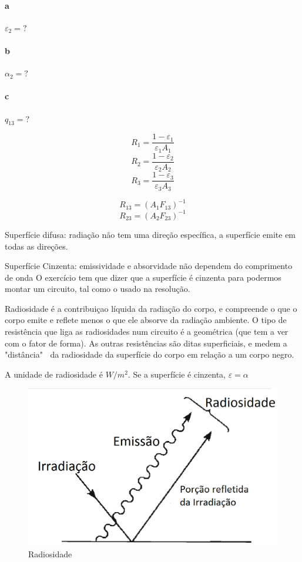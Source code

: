 \documentclass[a4paper, 12pt]{article}
\begin{document}
\paragraph*{a} $\varepsilon _{2} = ? $
\paragraph*{b} $\alpha _{2} = ? $
\paragraph*{c} $q_{13} = ? $

\[R_{1} = \frac{1-\varepsilon _{1}}{\varepsilon _{1} A_{1}}\]
\[R_{2} = \frac{1-\varepsilon _{2}}{\varepsilon _{2} A_{2}}\]
\[R_{3} = \frac{1-\varepsilon _{3}}{\varepsilon _{3} A_{3}}\]

\[R_{13} = (A_{1}F_{13})^{-1}\]
\[R_{23} = (A_{2}F_{23})^{-1}\]


Superfície difusa: radiação não tem uma direção específica, a superfície emite em todas as direções.

Superfície Cinzenta: emissividade e absorvidade não dependem do comprimento de onda
O exercício tem que dizer que a superfície é cinzenta para podermos montar um circuito, tal como o usado na resolução.

Radiosidade é a contribuiçao líquida da radiação do corpo, e compreende o que o corpo emite e reflete menos o que ele absorve da radiação ambiente. O tipo de resistência que liga as radiosidades num circuito é a geométrica (que tem a ver com o fator de forma). As outras resistências são ditas superficiais, e medem a "distância" $\ $ da radiosidade da superfície do corpo em relação a um corpo negro.

A unidade de radiosidade é $W/m^{2}$. Se a superfície é cinzenta, $\varepsilon = \alpha$

\begin{figure}[h]
\begin{center}
\includegraphics[scale=0.28]{./fig/3.png}
\caption{\label{fig:3}Radiosidade} 
\end{center}
\end{figure}
\end{document}
